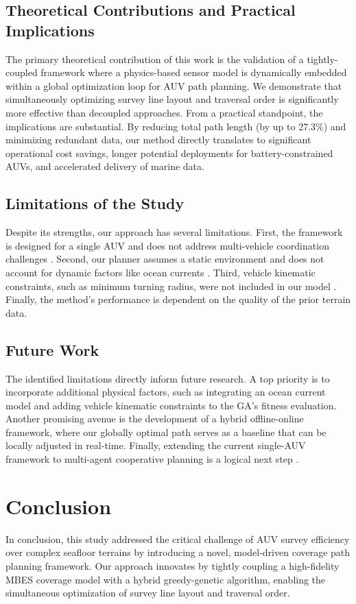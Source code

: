 \documentclass[compress]{cm}
\begin{document}
\subsection{Theoretical Contributions and Practical Implications}
The primary theoretical contribution of this work is the validation of a tightly-coupled framework where a physics-based sensor model is dynamically embedded within a global optimization loop for AUV path planning. We demonstrate that simultaneously optimizing survey line layout and traversal order is significantly more effective than decoupled approaches. From a practical standpoint, the implications are substantial. By reducing total path length (by up to 27.3\%) and minimizing redundant data, our method directly translates to significant operational cost savings, longer potential deployments for battery-constrained AUVs, and accelerated delivery of marine data.

\subsection{Limitations of the Study}
Despite its strengths, our approach has several limitations. First, the framework is designed for a single AUV and does not address multi-vehicle coordination challenges \cite{zhang2023multi}. Second, our planner assumes a static environment and does not account for dynamic factors like ocean currents \cite{mu2025coverage}. Third, vehicle kinematic constraints, such as minimum turning radius, were not included in our model \cite{li2024full}. Finally, the method's performance is dependent on the quality of the prior terrain data.

\subsection{Future Work}
The identified limitations directly inform future research. A top priority is to incorporate additional physical factors, such as integrating an ocean current model and adding vehicle kinematic constraints to the GA's fitness evaluation. Another promising avenue is the development of a hybrid offline-online framework, where our globally optimal path serves as a baseline that can be locally adjusted in real-time. Finally, extending the current single-AUV framework to multi-agent cooperative planning is a logical next step \cite{han2023hybrid}.

\section{Conclusion}
In conclusion, this study addressed the critical challenge of AUV survey efficiency over complex seafloor terrains by introducing a novel, model-driven coverage path planning framework. Our approach innovates by tightly coupling a high-fidelity MBES coverage model with a hybrid greedy-genetic algorithm, enabling the simultaneous optimization of survey line layout and traversal order.
\end{document}
